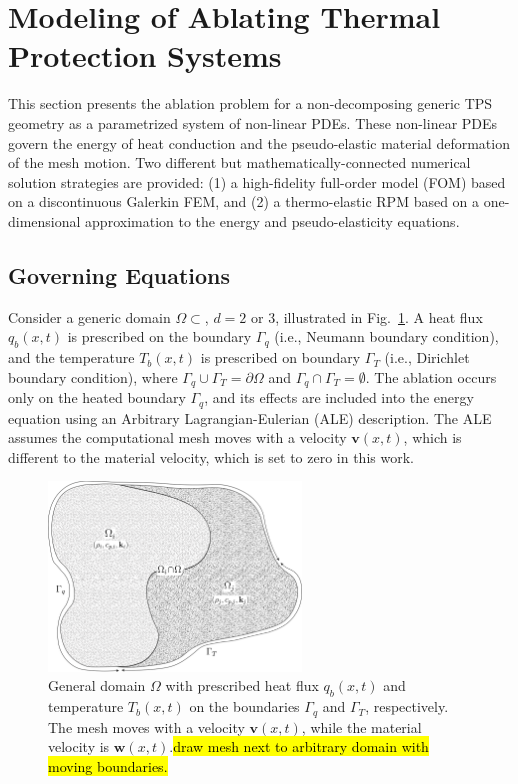 \section{Modeling of Ablating Thermal Protection Systems}

This section presents the ablation problem for a non-decomposing generic TPS geometry as a parametrized system of non-linear PDEs. These non-linear PDEs govern the energy of heat conduction and the pseudo-elastic material deformation of the mesh motion. Two different but mathematically-connected numerical solution strategies are provided: (1) a high-fidelity full-order model (FOM) based on a discontinuous Galerkin FEM, and (2) a thermo-elastic RPM based on a one-dimensional approximation to the energy and pseudo-elasticity equations.

\subsection{Governing Equations}

Consider a generic domain $\Omega\subset$, $d=2$ or $3$, illustrated in Fig.~\ref{fig_general_domain}. A heat flux $q_b(x,t)$ is prescribed on the boundary $\Gamma_q$ (i.e., Neumann boundary condition), and the temperature $T_b(x,t)$ is prescribed on boundary $\Gamma_T$ (i.e., Dirichlet boundary condition), where $\Gamma_q\cup\Gamma_T = \partial\Omega$ and $\Gamma_q\cap\Gamma_T = \emptyset$. The ablation occurs only on the heated boundary $\Gamma_q$, and its effects are included into the energy equation using an Arbitrary Lagrangian-Eulerian (ALE) description. The ALE assumes the computational mesh moves with a velocity $\mathbf{v}(x,t)$, which is different to the material velocity, which is set to zero in this work.

\begin{figure}
    \centering
    \includegraphics[width=0.6\textwidth]{./figs/general_domain.png}
    \caption{General domain $\Omega$ with prescribed heat flux $q_b(x,t)$ and temperature $T_b(x,t)$ on the boundaries $\Gamma_q$ and $\Gamma_T$, respectively. The mesh moves with a velocity $\mathbf{v}(x,t)$, while the material velocity is $\mathbf{w}(x,t)$.\hl{draw mesh next to arbitrary domain with moving boundaries.}}
    \label{fig_general_domain}
\end{figure}

